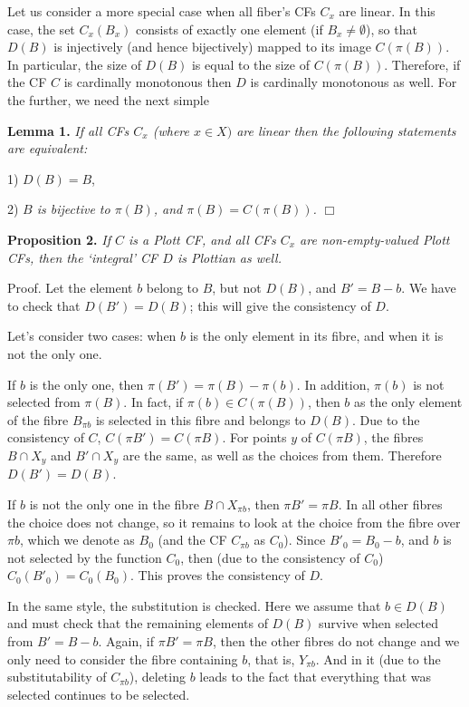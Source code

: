 \documentclass[12pt,a4paper]{article}
\begin{document}
Let us consider a more special case when all fiber's CFs $C_x$ are linear. In this case, the set $C_x(B_x)$ consists of exactly one element (if $B_x\ne \emptyset$), so that $D(B)$ is injectively (and hence bijectively) mapped to its image $C(\pi(B))$. In particular, the size of $D(B)$ is equal to the size of $C(\pi(B))$. Therefore, if the CF $C$ is cardinally monotonous then $D$ is cardinally monotonous as well. For the further, we need the next simple \medskip

\textbf{Lemma 1.} \emph{If all CFs $C_x$ (where $x\in X)$ are linear then the following statements are equivalent:}

           1) $D(B)=B$,

2) \emph{$B$ is bijective to $\pi(B)$, and $\pi(B)=C(\pi(B))$.}  $\Box$ \medskip

\textbf{Proposition 2.} \emph{If $C$ is a Plott CF, and all CFs $C_x$ are non-empty-valued Plott CFs, then the `integral' CF $D$ is Plottian as well.} \medskip

Proof. Let the element $b$ belong to $B$, but not $D(B)$, and $B'=B-b$. We have to check that $D(B')=D(B)$; this will give the consistency of $D$.

Let's consider two cases: when $b$ is the only element in its fibre, and
when it is not the only one.

If $b$ is the only one, then $\pi (B')=\pi(B)-\pi(b)$. In addition, $\pi(b)$ is not selected from $\pi(B)$. In fact, if $\pi (b)\in C(\pi (B))$, then $b$ as the only element of the fibre $B_{\pi b}$ is selected in this fibre and belongs to  $D(B)$. Due to the consistency of $C$, $C(\pi B')=C(\pi B)$. For points $y$ of $C(\pi B)$, the fibres $B\cap X_y$ and $B'\cap X_y$ are the same, as well as the choices from them. Therefore $D(B')=D(B)$.

If $b$ is not the only one in the fibre $B\cap X_{\pi b}$, then $\pi B'=\pi B$. In all other fibres the choice does not change, so it remains to look at the choice from the fibre over $\pi b$, which we denote as $B_0$ (and the CF
$C_{\pi b}$ as $C_0$). Since $B'_0=B_0-b$, and $b$ is not selected by the function $C_0$, then (due to the consistency of $C_0$) $C_0(B'_0)=C_0(B_0)$. This proves the consistency of $D$.

In the same style, the substitution is checked. Here we assume that $b\in D(B)$ and must check that the remaining elements of $D(B)$ survive when selected from $B'=B-b$. Again, if $\pi B'=\pi B$, then the other fibres do not change and we only need to consider the fibre containing $b$, that is, $Y_{\pi b}$. And in it (due to the substitutability of $C_{\pi b}$), deleting $b$ leads to the fact that everything that was selected continues to be selected.
\end{document}
